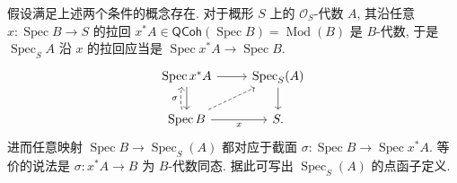 \documentclass{book}
\begin{document}
%	
%	
	假设满足上述两个条件的概念存在.
	对于概形 $S$ 上的 $\mathcal O_S$-代数 $A$, 其沿任意 $x\colon \operatorname{Spec} B \to S$ 的拉回 $x^*A\in\mathsf{QCoh}(\operatorname{Spec} B)=\operatorname{Mod}(B)$ 是 $B$-代数, 于是 $\operatorname{Spec}_S A$ 沿 $x$ 的拉回应当是 $\operatorname{Spec} x^*A \to \operatorname{Spec} B$.%
	\[\begin{tikzcd}[ampersand replacement=\&]
		{\operatorname{Spec} x^*A} \& {\operatorname{Spec}_S(A)} \\
		{\operatorname{Spec} B} \& S.
		\arrow[from=1-1, to=1-2]
		\arrow[from=1-1, to=2-1]
		\arrow[from=1-2, to=2-2]
		\arrow["\sigma", shift left, bend left=10, dashed, from=2-1, to=1-1]
		\arrow[dashed, from=2-1, to=1-2]
		\arrow["x"', from=2-1, to=2-2]
	\end{tikzcd}\]
	进而任意映射 $\operatorname{Spec} B\to \operatorname{Spec}_S (A)$ 都对应于截面 $\sigma\colon\operatorname{Spec} B\to\operatorname{Spec} x^*A$.
	等价的说法是 $\sigma\colon x^*A\to B$ 为 $B$-代数同态.
	据此可写出 $\operatorname{Spec}_S(A)$ 的点函子定义.
	
\end{document}
